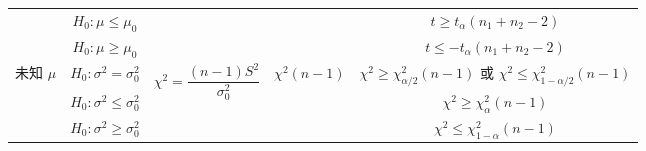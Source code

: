 \begin{table}[H]
{\begin{tabular}{ccccc}
                                                          & $H_0:\mu\leqslant \mu_0$             &                                                                                                                   &                                                                                  & $t\geqslant t_{\alpha}(n_1+n_2-2)$                    \\
                                                          & $H_0:\mu\geqslant \mu_0$             &                                                                                                                   &                                                                                  & $t\leqslant -t_{\alpha}(n_1+n_2-2)$                   \\
            \midrule
            \multirow{3}{*}{未知 $\mu$}                   & $H_0:\sigma^2=\sigma_0^2$            & \multirow{3}{*}{$\chi^2=\dfrac{(n-1)S^2}{\sigma_0^2}$}                                                            & \multirow{3}{*}{$\chi^2(n-1)$}                                                   & \makecell[c]{$\chi^2\geqslant \chi^2_{\alpha/2}(n-1)$ 或 \\ $\chi^2\leqslant \chi_{1-\alpha/2}^2(n-1)$} \\
                                                          & $H_0:\sigma^2\leqslant \sigma_0^2$   &                                                                                                                   &                                                                                  & $\chi^2\geqslant \chi^2_\alpha(n-1)$                  \\
                                                          & $H_0:\sigma^2\geqslant \sigma_0^2$   &                                                                                                                   &                                                                                  & $\chi^2\leqslant \chi^2_{1-\alpha}(n-1)$              \\
            \midrule

\end{tabular}}
\end{table}
